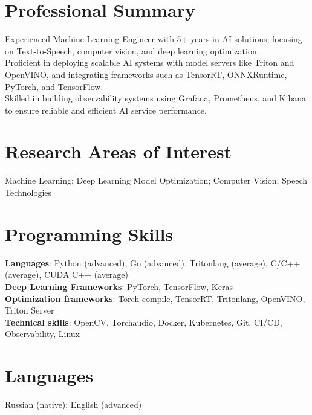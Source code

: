 \section{\sc Professional Summary}
Experienced Machine Learning Engineer with 5+ years in AI solutions, focusing on Text-to-Speech, computer vision, and deep learning optimization. \\
Proficient in deploying scalable AI systems with model servers like Triton and OpenVINO, and integrating frameworks such as TensorRT, ONNXRuntime, PyTorch, and TensorFlow. \\
Skilled in building observability systems using Grafana, Prometheus, and Kibana to ensure reliable and efficient AI service performance.

\section{\sc Research Areas of Interest}
{Machine Learning; Deep Learning Model Optimization; Computer Vision; Speech Technologies}

\section{\sc Programming Skills}
\textbf{Languages}: Python (advanced), Go (advanced), Tritonlang (average), C/C++ (average), CUDA C++ (average) \\
\textbf{Deep Learning Frameworks}: PyTorch, TensorFlow, Keras \\
\textbf{Optimization frameworks}: Torch compile, TensorRT, Tritonlang, OpenVINO, Triton Server \\
\textbf{Technical skills}: OpenCV, Torchaudio, Docker, Kubernetes, Git, CI/CD, Observability, Linux

\section{\sc Languages}
{Russian (native); English (advanced)}

\endinput
